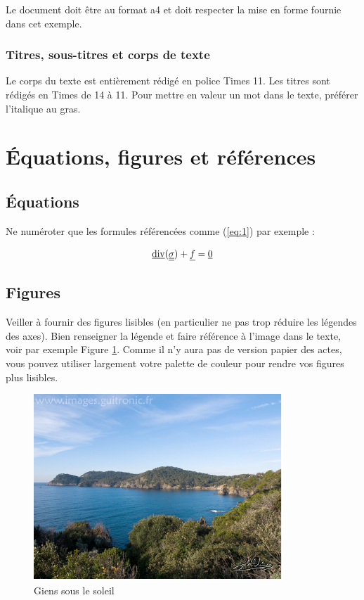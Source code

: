 \documentclass{CSMA2017}
\begin{document}
Le document doit être au format a4 et doit respecter la mise en forme fournie dans cet exemple.

\subsubsection{Titres, sous-titres et corps de texte}
Le corps du texte est entièrement rédigé en police Times 11. Les titres sont rédigés en Times de 14 à 11. Pour mettre en valeur un mot dans le texte, préférer l'italique au gras.


\section{Équations, figures et références}

\subsection{Équations}

Ne numéroter que les formules référencées comme (\ref{eq:1}) par exemple :

\begin{equation}\label{eq:1}
\underline{\mathop{\rm div}\nolimits} (\underline {\underline {\sigma}}) + \underline{f} = \underline{0}
\end{equation}

\subsection{Figures}

Veiller à fournir des figures lisibles (en particulier ne pas trop réduire les légendes des axes). Bien renseigner la légende et faire référence à l'image dans le texte, voir par exemple Figure \ref{fig:Giens}. Comme il n'y aura pas de version papier des actes, vous pouvez utiliser largement votre palette de couleur pour rendre vos figures plus lisibles.

\begin{figure}[!htb]
\centering
\includegraphics[height=.25\textheight]{Giens}
\caption{Giens sous le soleil}
\label{fig:Giens}
\end{figure}
\end{document}
